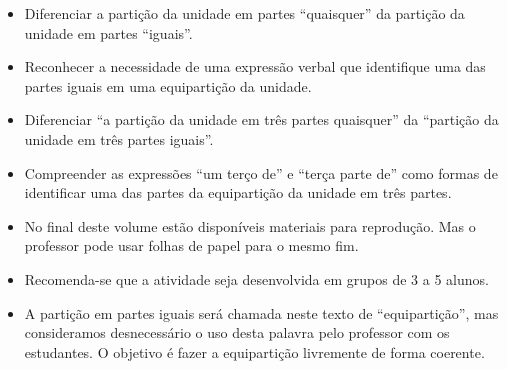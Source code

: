 \begin{atividade}\label{chap1-ativ1}

\objetivos
\begin{itemize} %
    \item       Diferenciar a partição da unidade em partes ``quaisquer'' da partição da unidade em partes       ``iguais''. 
    \item       Reconhecer a necessidade de uma expressão verbal que identifique uma das partes iguais em uma equipartição da unidade.
    \item       Diferenciar ``a partição da unidade em três partes quaisquer'' da ``partição da unidade em três partes iguais''.
    \item       Compreender as expressões ``um terço de'' e ``terça parte de'' como formas de identificar uma das partes da equipartição da unidade em três partes.
\end{itemize}

\discussoes
\begin{itemize} %
  \item No final deste volume estão disponíveis materiais para reprodução. Mas o professor pode usar folhas de papel para o mesmo fim.
  \item Recomenda-se que a atividade seja desenvolvida em grupos de 3 a 5 alunos.
  \item A partição em partes iguais será chamada neste texto de ``equipartição'', mas consideramos desnecessário o uso desta palavra pelo professor com os estudantes. O objetivo é fazer a equipartição livremente de forma coerente. 


\end{itemize}
\end{atividade}
